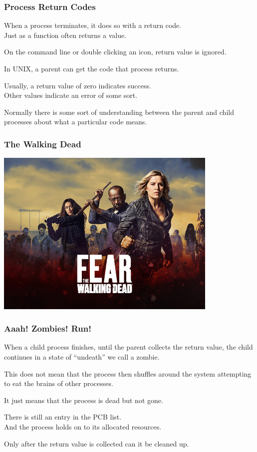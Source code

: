 \begin{frame}
	\frametitle{Process Return Codes}

	When a process terminates, it does so with a return code.\\
	\quad  Just as a function often returns a value.

	On the command line or double clicking an icon, return value is ignored.

	In UNIX, a parent can get the code that process returns.

	Usually, a return value of zero indicates success.\\
	\quad Other values indicate an error of some sort.

	Normally there is some sort of understanding between the parent and child processes about what a particular code means.

\end{frame}


\begin{frame}
	\frametitle{The Walking Dead}

	\begin{center}
		\includegraphics[width=0.8\textwidth]{images/walking-dead.jpg}
	\end{center}

\end{frame}



\begin{frame}
	\frametitle{Aaah! Zombies! Run!}

	When a child process finishes, until the parent collects the return value, the child continues in a state of ``undeath'' we call a \alert{zombie}.

	This does not mean that the process then shuffles around the system attempting to eat the brains of other processes.

	It just means that the process is dead but not gone.

	There is still an entry in the PCB list.\\
	\quad And the process holds on to its allocated resources.

	Only after the return value is collected can it be cleaned up.

\end{frame}

